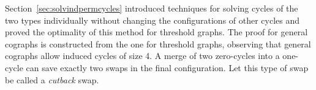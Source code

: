 \documentclass[msc,english,table,xcdraw]{ppgccufmg}
\begin{document}
Section~\ref{sec:solvindpermcycles} introduced techniques for solving cycles of the  two types individually without changing the configurations of other cycles and proved 
the optimality of this method for threshold graphs.
The proof for general cographs is constructed from the one for threshold graphs, 
observing that general cographs allow induced cycles of size 4.
A merge of two zero-cycles into a one-cycle can save exactly two swaps
in the final configuration.
Let this type of swap be called a \textit{cutback} swap.



\end{document}
